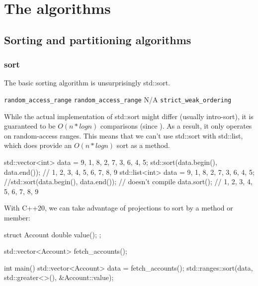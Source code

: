 \chapter{The algorithms}

\section{Sorting and partitioning algorithms}

\subsection{sort}

The basic sorting algorithm is unsurprisingly std::sort.


\constraints
    {\texttt{random\_access\_range}}
    {\texttt{random\_access\_range}}
    {N/A}
    {\texttt{strict\_weak\_ordering}}
    
While the actual implementation of std::sort might differ (usually intro-sort), it is guaranteed to be $O(n*logn)$ comparisons (since ). As a result, it only operates on random-access ranges. This means that we can’t use std::sort with std::list, which does provide an $O(n*logn)$ sort as a method.

\begin{box-note}
\begin{cppcode}
{
    std::vector<int> data = {9, 1, 8, 2, 7, 3, 6, 4, 5};
    std::sort(data.begin(), data.end());
    // 1, 2, 3, 4, 5, 6, 7, 8, 9
}
{
    std::list<int> data = {9, 1, 8, 2, 7, 3, 6, 4, 5};
    //std::sort(data.begin(), data.end()); // doesn't compile
    data.sort();
    // 1, 2, 3, 4, 5, 6, 7, 8, 9
}
\end{cppcode}
\end{box-note}

With C++20, we can take advantage of projections to sort by a method or member:

\begin{box-note}
\begin{cppcode}
struct Account {
    double value();
};

std::vector<Account> fetch_accounts();

int main() {
    std::vector<Account> data = fetch_accounts();
    std::ranges::sort(data, std::greater<>(), &Account::value);
}
\end{cppcode}
\end{box-note}

